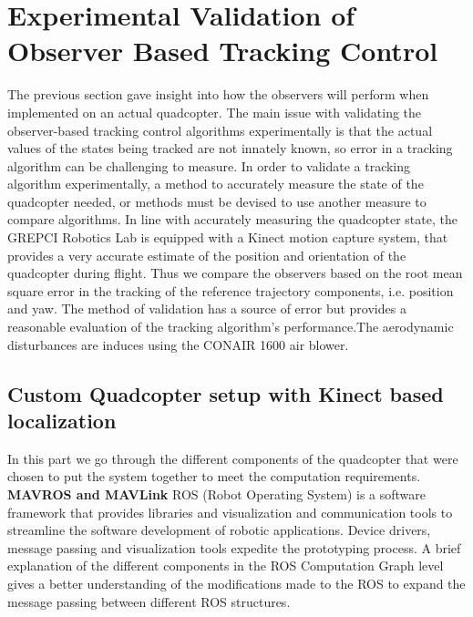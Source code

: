 \documentclass[letterpaper%
, twoside%
, 12pt%
,memoire%
, english%
,creativecommons,hyperref%
]{thETS}
\begin{document}
\chapter{Experimental Validation of Observer Based Tracking Control} \label{Chap:ResultsPrac}
The previous section gave insight into how the observers will perform when implemented on an actual quadcopter. The main issue with validating the observer-based tracking control algorithms experimentally is that the actual values of the states being tracked are not innately known, so error in a tracking algorithm can be challenging to measure. In order to validate a tracking algorithm experimentally, a method to accurately measure the state of the quadcopter needed, or methods must be devised to use another measure to compare algorithms. In line with accurately measuring the quadcopter state, the GREPCI Robotics Lab is equipped with a Kinect motion capture system, that provides a very accurate estimate of the position and orientation of the quadcopter during flight. Thus we compare the observers based on the root mean square error in the tracking of the reference trajectory components, i.e. position and yaw. The method of validation has a source of error but provides a reasonable evaluation of the tracking algorithm's performance.The aerodynamic disturbances are induces using the CONAIR 1600 air blower.

\section{Custom Quadcopter setup with Kinect based localization}
In this part we go through the different components of the quadcopter that were chosen to put the system together to meet the computation requirements. \\
\textbf{MAVROS and MAVLink}
ROS (Robot Operating System) is a software framework that provides libraries and visualization and communication tools to streamline the software development of robotic applications. Device drivers, message passing and visualization tools expedite the prototyping process. 
A brief explanation of the different components in the ROS Computation Graph level gives a better understanding of the modifications made to the ROS to expand the message passing between different ROS structures. 
\end{document}
